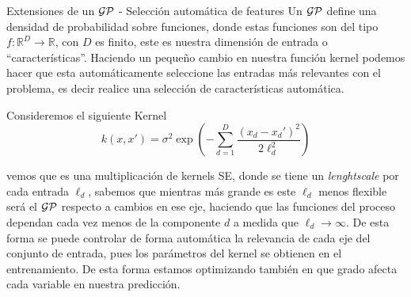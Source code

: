 \documentclass[handout, 9pt]{beamer}
\begin{document}
\begin{frame}{Extensiones de un $\mathcal{GP}$ - Selección automática de features}
    Un $\mathcal{GP}$ define una densidad de probabilidad sobre funciones, donde estas funciones son del tipo $f: \mathbb{R}^D \rightarrow \mathbb{R}$, con $D$ es finito, este es nuestra dimensión de entrada o ``características''. Haciendo un pequeño cambio en nuestra función kernel podemos hacer que esta automáticamente seleccione las entradas más relevantes con el problema, es decir realice una selección de características automática.
    \vspace{0.2cm} \pause

    Consideremos el siguiente Kernel 
        \begin{equation*}
        k(x, x') = \sigma^2 \exp\left( -\sum_{d=1}^{D} \frac{(x_d - x_d')^2}{2\ell_d^2}\right)
        \end{equation*} \pause 
    
    
    vemos que es una multiplicación de kernels SE, donde se tiene un \textit{lenghtscale} por cada entrada $\ell_d$, sabemos que mientras más grande es este $\ell_d$ menos flexible será el $\mathcal{GP}$ respecto a cambios en ese eje, haciendo que las funciones del proceso dependan cada vez menos de la componente $d$ a medida que $\ell_d \rightarrow \infty$. De esta forma se puede controlar de forma automática la relevancia de cada eje del conjunto de entrada, pues los parámetros del kernel se obtienen en el entrenamiento. De esta forma estamos optimizando también en que grado afecta cada variable en nuestra predicción.

\end{frame}
\end{document}
